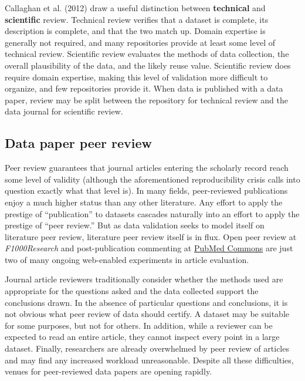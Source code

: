\documentclass[10pt,a4paper,twocolumn]{article}
\begin{document}
{{Callaghan et al. (2012)\cite{sarah_callaghan_making_2012} draw a useful distinction between \textbf{technical} and \textbf{scientific} review.
Technical review verifies that a dataset is complete, its description is complete, and that the two match up.
Domain expertise is generally not required, and many repositories provide at least some level of technical review.
Scientific review evaluates the methods of data collection, the overall plausibility of the data, and the likely reuse value.
Scientific review does require domain expertise, making this level of validation more difficult to organize, and few repositories provide it.
When data is published with a data paper, review may be split between the repository for technical review and the data journal for scientific review.

\subsection*{Data paper peer review}\label{data-paper-peer-review}

Peer review guarantees that journal articles entering the scholarly record reach some level of validity (although the aforementioned reproducibility crisis calls into question exactly what that level is).
In many fields, peer-reviewed publications enjoy a much higher status than any other literature.
Any effort to apply the prestige of ``publication'' to datasets cascades naturally into an effort to apply the prestige of ``peer review.''
But as data validation seeks to model itself on literature peer review, literature peer review itself is in flux\cite{pulverer_transparent_2010, herron_is_2012, kriegeskorte_emerging_2012}.
Open peer review at \emph{F1000Research} and post-publication commenting at \href{http://www.ncbi.nlm.nih.gov/pubmedcommons/}{PubMed Commons} are just two of many ongoing web-enabled experiments in article evaluation.

Journal article reviewers traditionally consider whether the methods used are appropriate for the questions asked and the data collected support the conclusions drawn.
In the absence of particular questions and conclusions, it is not obvious what peer review of data should certify.
A dataset may be suitable for some purposes, but not for others.\cite{parsons_data_2010}
In addition, while a reviewer can be expected to read an entire article, they cannot inspect every point in a large dataset.
Finally, researchers are already overwhelmed by peer review of articles\cite{diederich_are_2013} and may find any increased workload unreasonable.
Despite all these difficulties, venues for peer-reviewed data papers are opening rapidly.

}}
\end{document}
